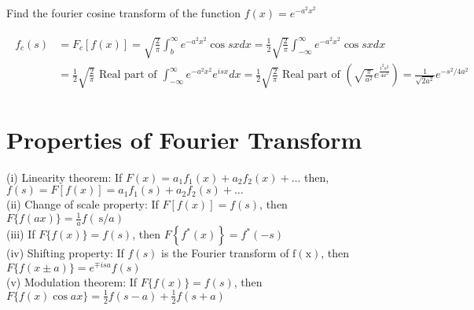 \begin{exercise}
	Find the fourier cosine transform of the function $f(x)=e^{-a^{2} x^{2}}$
\end{exercise}
\begin{answer}
	\begin{align*}
	\begin{aligned}
	f_{c}(s) &=F_{c}[f(x)]=\sqrt{\frac{2}{\pi}} \int_{b}^{\infty} e^{-a^{2} x^{2}} \cos s x d x=\frac{1}{2} \sqrt{\frac{2}{\pi}} \int_{-\infty}^{\infty} e^{-a^{2} x^{2}} \cos s x d x \\
	&=\frac{1}{2} \sqrt{\frac{2}{\pi}} \text { Real part of } \int_{-\infty}^{\infty} e^{-a^{2} x^{2}} e^{i s x} d x=\frac{1}{2} \sqrt{\frac{2}{\pi}} \text { Real part of }\left(\sqrt{\frac{\pi}{a^{2}}} e^{\frac{i^{2} s^{2}}{4 a^{2}}}\right)=\frac{1}{\sqrt{2 a^{2}}} e^{-s^{2} / 4 a^{2}}
	\end{aligned}
	\end{align*}
\end{answer}
\section{Properties of Fourier Transform}
(i) Linearity theorem: If $F(x)=a_{1} f_{1}(x)+a_{2} f_{2}(x)+\ldots$ then, $f(s)=F[f(x)]=a_{1} f_{1}(s)+a_{2} f_{2}(s)+\ldots$\\
(ii) Change of scale property: If $F[f(x)]=f(s)$, then $F\{f(a x)\}=\frac{1}{a} f(\mathrm{~s} / a)$\\
(iii) If $F\{f(x)\}=f(s)$, then $F\left\{f^{*}(x)\right\}=f^{*}(-s)$\\
(iv) Shifting property: If $f(s)$ is the Fourier transform of $\mathrm{f}(\mathrm{x})$, then $F\{f(x \pm a)\}=e^{\mp i s a} f(s)$\\
(v) Modulation theorem: If $F\{f(x)\}=f(s)$, then $F\{f(x) \cos a x\}=\frac{1}{2} f(s-a)+\frac{1}{2} f(s+a)$
